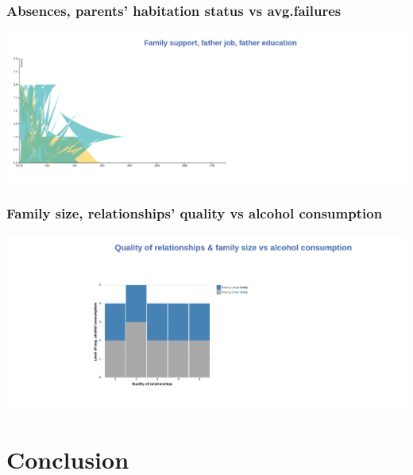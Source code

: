 \documentclass[titlepage, 12pt]{article}
\begin{document}
\subsubsection{Absences, parents' habitation status vs avg.failures}
\begin{center}
\includegraphics[scale=0.2]{5}
\end{center}
\subsubsection{Family size, relationships' quality vs alcohol consumption}
\begin{center}
\includegraphics[scale=0.2]{8}
\end{center}




\section{Conclusion}
\end{document}
